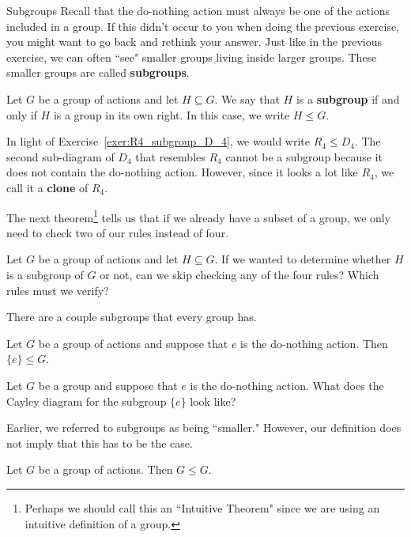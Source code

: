 \begin{section}{Subgroups}
Recall that the do-nothing action must always be one of the actions included in a group.  If this didn't occur to you when doing the previous exercise, you might want to go back and rethink your answer.  Just like in the previous exercise, we can often ``see" smaller groups living inside larger groups.  These smaller groups are called \textbf{subgroups}.

\begin{intuitivedef}
Let $G$ be a group of actions and let $H\subseteq G$.  We say that $H$ is a \textbf{subgroup} if and only if $H$ is a group in its own right.  In this case, we write $H\leq G$.
\end{intuitivedef}

In light of Exercise~\ref{exer:R4_subgroup_D_4}, we would write $R_4\leq D_4$.  The second sub-diagram of $D_4$ that resembles $R_4$ cannot be a subgroup because it does not contain the do-nothing action.  However, since it looks a lot like $R_4$, we call it a \textbf{clone} of $R_4$.

The next theorem\footnote{Perhaps we should call this an ``Intuitive Theorem" since we are using an intuitive definition of a group.} tells us that if we already have a subset of a group, we only need to check two of our rules instead of four.

\begin{exercise}\label{exer:informal_subgroup_criterion}
Let $G$ be a group of actions and let $H\subseteq G$. If we wanted to determine whether $H$ is a subgroup of $G$ or not, can we skip checking any of the four rules? Which rules must we verify?
\end{exercise}

There are a couple subgroups that every group has.

\begin{theorem}\label{thm:trivial_subgroup1}
Let $G$ be a group of actions and suppose that $e$ is the do-nothing action.  Then $\{e\}\leq G$.
\end{theorem}

\begin{exercise}
Let $G$ be a group and suppose that $e$ is the do-nothing action.  What does the Cayley diagram for the subgroup $\{e\}$ look like?
\end{exercise}

Earlier, we referred to subgroups as being ``smaller."  However, our definition does not imply that this has to be the case.

\begin{theorem}\label{thm:trivial_subgroup2}
Let $G$ be a group of actions.  Then $G\leq G$.
\end{theorem}


\end{section}

